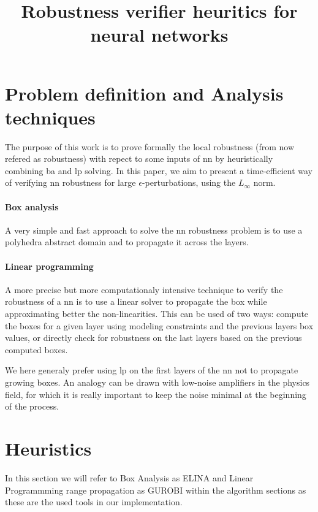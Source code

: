 \documentclass[8pt,a4paper]{article}
\title{
	Robustness verifier heuritics for neural networks
}
\begin{document}
\maketitle

\section{Problem definition and Analysis techniques}

The purpose of this work is to prove formally the local robustness (from now refered as robustness) with repect to some inputs of \gls{nn} by heuristically combining \gls{ba} and \gls{lp} solving. 
In this paper, we aim to present a time-efficient way of verifying \gls{nn} robustness for large $\epsilon$-perturbations, using the $L_\infty$ norm.

\paragraph*{Box analysis}

A very simple and fast approach to solve the \gls{nn} robustness problem is to use a polyhedra abstract domain and to propagate it across the layers.

\paragraph*{Linear programming}

A more precise but more computationaly intensive technique to verify the robustness of a \gls{nn} is to use a linear solver to propagate the box while approximating better the non-linearities. This can be used of two ways: compute the boxes for a given layer using modeling constraints and the previous layers box values, or directly check for robustness on the last layers based on the previous computed boxes.

We here generaly prefer using \gls{lp} on the first layers of the \gls{nn} not to propagate growing boxes. An analogy can be drawn with low-noise amplifiers in the physics field, for which it is really important to keep the noise minimal at the beginning of the process.

\section{Heuristics}

In this section we will refer to Box Analysis as ELINA and Linear Programmming range propagation as GUROBI within the algorithm sections as these are the used tools in our implementation.
\end{document}
